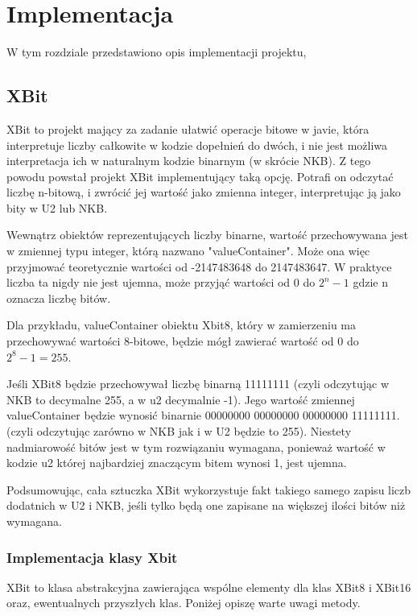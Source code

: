 \chapter{Implementacja}
	
	W tym rozdziale przedstawiono opis implementacji projektu,  



	\section{XBit}
	XBit to projekt mający za zadanie ułatwić operacje bitowe w javie, która interpretuje liczby całkowite w kodzie dopełnień do dwóch, i nie jest możliwa interpretacja ich w naturalnym kodzie binarnym (w skrócie NKB). Z tego powodu powstał projekt XBit implementujący taką opcję. Potrafi on odczytać liczbę n-bitową, i zwrócić jej wartość jako zmienna integer, interpretując ją jako bity w U2 lub NKB.
	
	
	
	Wewnątrz obiektów reprezentujących liczby binarne, wartość przechowywana jest w zmiennej typu integer, którą nazwano "valueContainer". Może ona więc przyjmować teoretycznie wartości od -2147483648 do 2147483647. W praktyce liczba ta nigdy nie jest ujemna, może przyjąć wartości od 0 do $ 2^{n}-1 $ gdzie n oznacza liczbę bitów. 
	
	Dla przykładu,  valueContainer obiektu Xbit8, który w zamierzeniu ma przechowywać wartości 8-bitowe, będzie mógł zawierać wartość od 0 do $ 2^{8}-1 = 255 $. 
	 	 
	Jeśli XBit8 będzie przechowywał liczbę binarną 11111111 (czyli odczytując w NKB to decymalne 255, a w u2 decymalnie -1). Jego wartość zmiennej valueContainer będzie wynosić binarnie 
	00000000 00000000 00000000 11111111. (czyli odczytując zarówno w NKB jak i w U2 będzie to 255). Niestety nadmiarowość bitów jest w tym rozwiązaniu wymagana, ponieważ wartość w kodzie u2 której najbardziej znaczącym bitem wynosi 1, jest ujemna. 
	
	Podsumowując, cała sztuczka XBit wykorzystuje fakt takiego samego zapisu liczb dodatnich w U2 i NKB, jeśli tylko będą one zapisane na większej ilości bitów niż wymagana.
	 
	
	\subsection{Implementacja klasy Xbit}
	XBit to klasa abstrakcyjna zawierająca wspólne elementy dla klas XBit8 i XBit16 oraz, ewentualnych przyszłych klas. Poniżej opiszę warte uwagi metody.
	

